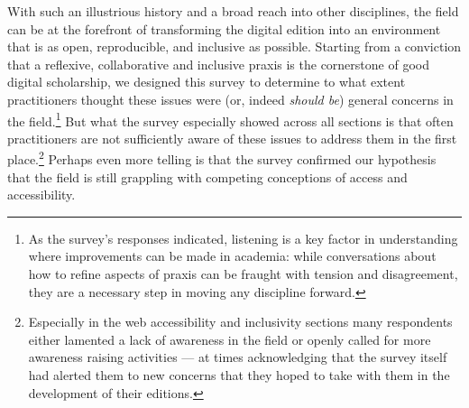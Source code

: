 \begin{paper}
\begin{quote}
\begin{flushright}\citep[15-17]{boot_introduction_2017}\end{flushright}
\end{quote}

With such an illustrious history and a broad reach into other
disciplines, the field can be at the forefront of transforming the
digital edition into an environment that is as open, reproducible, and
inclusive as possible. Starting from a conviction that a reflexive,
collaborative and inclusive praxis is the cornerstone of good digital
scholarship, we designed this survey to determine to what extent
practitioners thought these issues were (or, indeed \emph{should be})
general concerns in the field.\footnote{As the survey's responses
  indicated, listening is a key factor in understanding where
  improvements can be made in academia: while conversations about how to
  refine aspects of praxis can be fraught with tension and disagreement,
  they are a necessary step in moving any discipline forward.} But what
the survey especially showed across all sections is that often
practitioners are not sufficiently aware of these issues to address them
in the first place.\footnote{Especially in the web accessibility and
  inclusivity sections many respondents either lamented a lack of
  awareness in the field or openly called for more awareness raising
  activities --- at times acknowledging that the survey itself had
  alerted them to new concerns that they hoped to take with them in the
  development of their editions.} Perhaps even more telling is that the
survey confirmed our hypothesis that the field is still grappling with
competing conceptions of access and accessibility.


\end{paper}
